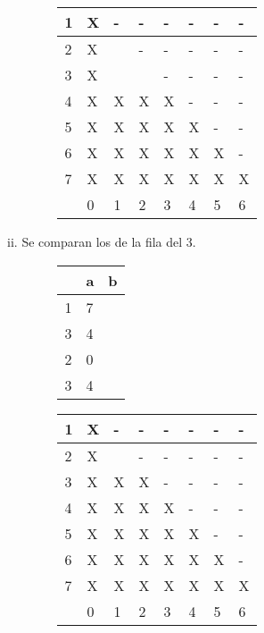 \documentclass[11pt,a4paper]{article}
\begin{document}
\begin{enumerate}[a)]
\begin{enumerate}[I.]
\begin{enumerate}[i.]
\begin{figure}[H]
				\end{figure}
				\begin{figure}[H]
				\centering
					\begin{tabular}{|l|l|l|l|l|l|l|l|}
					\hline
					1 & X & - & - & - & - & - & - \\ \hline
					2 & X &   & - & - & - & - & - \\ \hline
					3 & X &   &   & - & - & - & - \\ \hline
					4 & X & X & X & X & - & - & - \\ \hline
					5 &	X & X & X & X & X & - & - \\ \hline
					6 & X & X & X & X & X & X & - \\ \hline
					7 & X & X & X & X & X & X & X \\ \hline
			  		  & 0 & 1 & 2 & 3 & 4 & 5 & 6 \\ \hline
					\end{tabular}
				\end{figure}
				\item Se comparan los de la fila del $3$.
				\begin{figure}[H]
				\centering
					\begin{tabular}{l|ll}
					  & a & b \\ \hline
					1 & 7 &   \\
					3 & 4 &   \\ \hline
					2 & 0 &   \\
					3 & 4 &   \\ 
					\end{tabular}
				\end{figure}
				\begin{figure}[H]
				\centering
					\begin{tabular}{|l|l|l|l|l|l|l|l|}
					\hline
					1 & X & - & - & - & - & - & - \\ \hline
					2 & X &   & - & - & - & - & - \\ \hline
					3 & X & X & X & - & - & - & - \\ \hline
					4 & X & X & X & X & - & - & - \\ \hline
					5 &	X & X & X & X & X & - & - \\ \hline
					6 & X & X & X & X & X & X & - \\ \hline
					7 & X & X & X & X & X & X & X \\ \hline
			  		  & 0 & 1 & 2 & 3 & 4 & 5 & 6 \\ \hline
					\end{tabular}
				\end{figure}

\end{enumerate}
\end{enumerate}
\end{enumerate}
\end{document}
